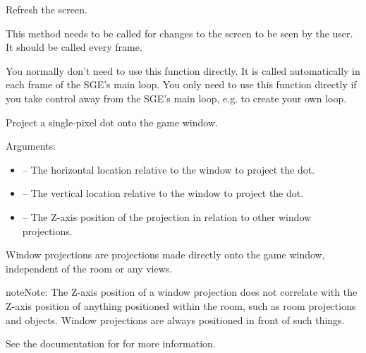 \documentclass[letterpaper,10pt,english]{sphinxmanual}
\begin{document}

\begin{fulllineitems}
\label{dsp:sge.dsp.Game.refresh}
Refresh the screen.

This method needs to be called for changes to the screen to be
seen by the user.  It should be called every frame.

You normally don't need to use this function directly.  It is
called automatically in each frame of the SGE's main loop.  You
only need to use this function directly if you take control away
from the SGE's main loop, e.g. to create your own loop.

\end{fulllineitems}


\begin{fulllineitems}
\label{dsp:sge.dsp.Game.project_dot}
Project a single-pixel dot onto the game window.

Arguments:
\begin{itemize}
\item {} 
 -- The horizontal location relative to the window to
project the dot.

\item {} 
 -- The vertical location relative to the window to
project the dot.

\item {} 
 -- The Z-axis position of the projection in relation to
other window projections.

\end{itemize}

Window projections are projections made directly onto the game
window, independent of the room or any views.

\begin{notice}{note}{Note:}
The Z-axis position of a window projection does not
correlate with the Z-axis position of anything positioned
within the room, such as room projections and
{\hyperref[dsp:sge.dsp.Object]{\emph{}}} objects.  Window projections are
always positioned in front of such things.
\end{notice}

See the documentation for {\hyperref[gfx:sge.gfx.Sprite.draw_dot]{\emph{}}} for
more information.

\end{fulllineitems}
\end{document}
